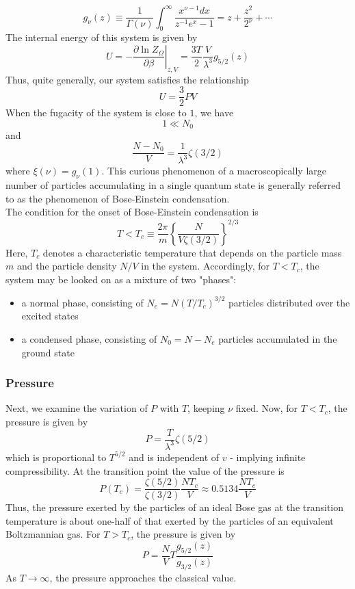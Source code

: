 \documentclass[cyan]{elegantnote}
\begin{document}
\[g_{\nu}(z) \equiv \frac{1}{\Gamma(\nu)} \int_{0}^{\infty} \frac{x^{\nu-1}dx}{z^{-1}e^x -1} = z + \frac{z^2}{2^{\nu}} + \cdots\]
The internal energy of this system is given by
\[U = - \left. \frac{\partial \ln Z_{\Omega}}{\partial \beta} \right|_{z,V} = \frac{3T}{2} \frac{V}{\lambda^3} g_{5/2}(z)\]
Thus, quite generally, our system satisfies the relationship
\[U = \frac{3}{2}PV\]
When the fugacity of the system is close to $1$, we have 
\[1 \ll N_0\]
and
\[\frac{N - N_0}{V} = \frac{1}{\lambda^3}\zeta(3/2) \] where $\xi(\nu) = g_{\nu}(1)$.
This curious phenomenon of a macroscopically large number of particles accumulating in a single quantum state is generally referred to as the phenomenon of Bose-Einstein condensation.
\\
The condition for the onset of Bose-Einstein condensation is
\[T < T_c \equiv \frac{2\pi}{m} \left\{ \frac{N}{V\zeta(3/2)} \right\}^{2/3}\]
Here, $T_c$ denotes a characteristic temperature that depends on the particle mass $m$ and the particle density $N/V$ in the system. Accordingly, for $T < T_c$, the system may be looked on as a mixture of two "phases":
\begin{itemize}
\item a normal phase, consisting of $N_e = N(T/T_c)^{3/2}$ particles distributed over the excited states
\item a condensed phase, consisting of $N_0 = N - N_e$ particles accumulated in the ground state
\end{itemize}

\subsubsection{Pressure}
Next, we examine the variation of $P$ with $T$, keeping $\nu$ fixed. Now, for $T < T_c$, the pressure is given by
\[P = \frac{T}{\lambda^3}\zeta(5/2)\]
which is proportional to $T^{5/2}$ and is independent of $v$ - implying infinite compressibility.
At the transition point the value of the pressure is
\[P(T_c) = \frac{\zeta(5/2)}{\zeta(3/2)} \frac{NT_c}{V} \approx 0.5134 \frac{NT_c}{V}\]
Thus, the pressure exerted by the particles of an ideal Bose gas at the transition temperature is about one-half of that exerted by the particles of an equivalent Boltzmannian gas. For $T > T_c$, the pressure is given by
\[P = \frac{N}{V}T \frac{g_{5/2}(z)}{g_{3/2}(z)}\]
As $T \to \infty$, the pressure approaches the classical value.
\end{document}
